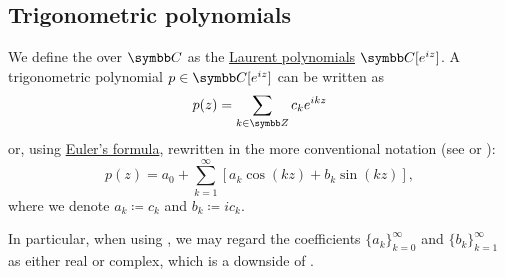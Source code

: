 \subsection{Trigonometric polynomials}\label{subsec:trigonometric_polynomials}

\begin{definition}\label{def:trigonometric_polynomial}
  We define the  over \( \BC \) as the \hyperref[def:laurent_polynomial/polynomial]{Laurent polynomials} \( \BC[e^{iz}] \). A trigonometric polynomial \( p \in \BC[e^{iz}] \) can be written as
  \begin{equation}\label{def:trigonometric_polynomial/exponential}
    p(z) = \sum_{k \in \BZ} c_k e^{ikz}
  \end{equation}
  or, using \hyperref[thm:trigonometric_identities/eulers_formula]{Euler's formula}, rewritten in the more conventional notation (see \cite[1]{Боянов2008} or \cite[88]{Rudin1987}):
  \begin{equation}\label{def:trigonometric_polynomial/trigonometric}
    p(z) = a_0 + \sum_{k=1}^\infty [ a_k \cos(kz) + b_k \sin(kz) ],
  \end{equation}
  where we denote \( a_k \coloneqq c_k \) and \( b_k \coloneqq ic_k \).

  In particular, when using , we may regard the coefficients \( \{ a_k \}_{k=0}^\infty \) and \( \{ b_k \}_{k=1}^\infty \) as either real or complex, which is a downside of .
\end{definition}

